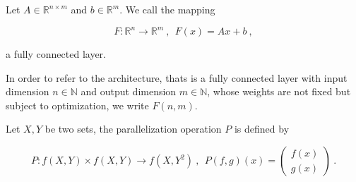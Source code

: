 \begin{definition}
    Let $A \in \mathbb R^{n \times m}$ and $b \in \mathbb R^m$. We call the mapping

        $$ F: \mathbb R^{n} \to \mathbb R^{m} ~, ~~ F(x) = Ax + b ~, $$

    a fully connected layer.
\end{definition}

In order to refer to the architecture,
thats is a fully connected layer with input dimension $n \in \mathbb N$ and output dimension $m \in \mathbb N$,
whose weights are not fixed but subject to optimization, 
we write $F(n, m)$.

\begin{definition}[Paralelization]
    Let $X, Y$ be two sets,
    the parallelization operation $P$ is defined by 

        $$P : f(X, Y) \times f(X, Y) \to f(X, Y^2) ~, ~~ P(f, g)(x) = \begin{pmatrix}
            f(x) \\ g(x)
        \end{pmatrix} ~.$$
        
\end{definition}